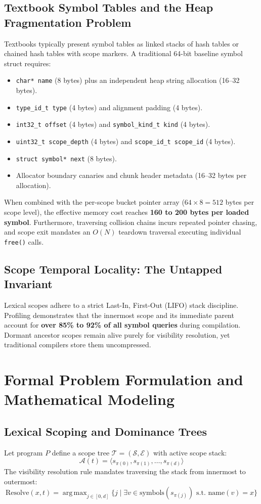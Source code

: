 \documentclass[11pt,a4paper]{article}
\begin{document}
\subsection{Textbook Symbol Tables and the Heap Fragmentation Problem}
Textbooks typically present symbol tables as linked stacks of hash tables or chained hash tables with scope markers. A traditional 64-bit baseline symbol struct requires:
\begin{itemize}
    \item \texttt{char* name} (8 bytes) plus an independent heap string allocation (16--32 bytes).
    \item \texttt{type\_id\_t type} (4 bytes) and alignment padding (4 bytes).
    \item \texttt{int32\_t offset} (4 bytes) and \texttt{symbol\_kind\_t kind} (4 bytes).
    \item \texttt{uint32\_t scope\_depth} (4 bytes) and \texttt{scope\_id\_t scope\_id} (4 bytes).
    \item \texttt{struct symbol* next} (8 bytes).
    \item Allocator boundary canaries and chunk header metadata (16--32 bytes per allocation).
\end{itemize}
When combined with the per-scope bucket pointer array ($64 \times 8 = 512$ bytes per scope level), the effective memory cost reaches \textbf{160 to 200 bytes per loaded symbol}. Furthermore, traversing collision chains incurs repeated pointer chasing, and scope exit mandates an $O(N)$ teardown traversal executing individual \texttt{free()} calls.

\subsection{Scope Temporal Locality: The Untapped Invariant}
Lexical scopes adhere to a strict Last-In, First-Out (LIFO) stack discipline. Profiling demonstrates that the innermost scope and its immediate parent account for \textbf{over 85\% to 92\% of all symbol queries} during compilation. Dormant ancestor scopes remain alive purely for visibility resolution, yet traditional compilers store them uncompressed.

\section{Formal Problem Formulation and Mathematical Modeling}
\subsection{Lexical Scoping and Dominance Trees}
Let program $P$ define a scope tree $\mathcal{T} = (\mathcal{S}, \mathcal{E})$ with active scope stack:
\begin{equation}
\mathcal{A}(t) = \langle s_{\pi(0)}, s_{\pi(1)}, \dots, s_{\pi(d)} \rangle
\end{equation}
The visibility resolution rule mandates traversing the stack from innermost to outermost:
\begin{equation}
\text{Resolve}(x, t) = \operatorname{arg\,max}_{j \in [0, d]} \{ j \mid \exists v \in \text{symbols}(s_{\pi(j)}) \text{ s.t. } \text{name}(v) = x \}
\end{equation}
\end{document}
